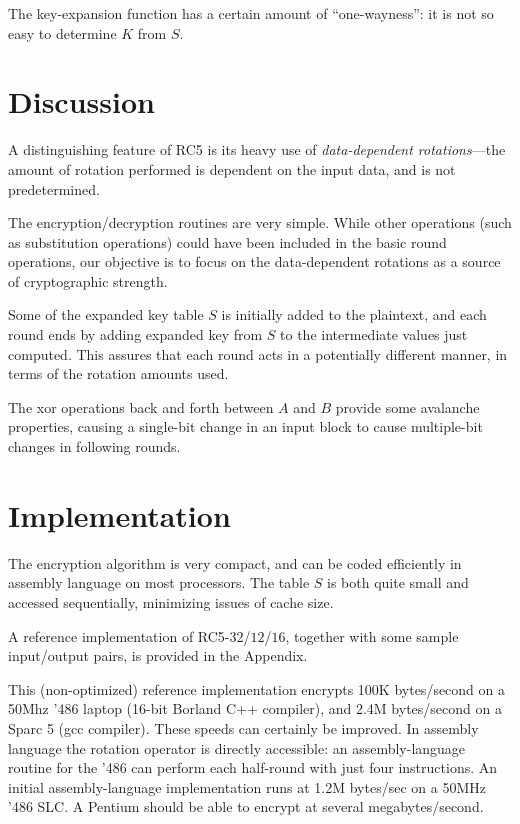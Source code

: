 The key-expansion function has a certain amount of ``one-wayness'': it is
not so easy to determine $K$ from $S$.

\section{Discussion}

A distinguishing feature of RC5 is its heavy use of
{\em data-dependent rotations}---the amount of rotation performed is
dependent on the input data, and is not predetermined.

The encryption/decryption routines are very simple.  While other
operations (such as substitution operations) could have been included
in the basic round operations, our objective is to focus on the
data-dependent rotations as a source of cryptographic strength.

Some of the expanded key table $S$ is initially added to the
plaintext, and each round ends by adding expanded key from $S$
to the intermediate values just computed.  This assures that each round
acts in a potentially different manner, in terms of the rotation amounts
used.

The xor operations back and forth between $A$ and $B$ 
provide some avalanche properties, causing a single-bit
change in an input block to cause multiple-bit changes in following rounds.

\section{Implementation}

The encryption algorithm is very compact, and can be coded efficiently
in assembly language on most processors.  The table $S$ is both quite
small and accessed sequentially, minimizing issues of cache size.

A reference implementation of RC5-$32$/$12$/$16$, together with some
sample input/output pairs, is provided in the Appendix.  

This (non-optimized) reference implementation encrypts 100K
bytes/second on a 50Mhz '486 laptop (16-bit Borland C++ compiler), 
and 2.4M bytes/second on a Sparc 5 (gcc compiler).
These speeds can certainly be improved.  In assembly
language the rotation operator is directly accessible: an
assembly-language routine for the '486 can perform each half-round
with just four instructions. An initial assembly-language
implementation runs at 1.2M bytes/sec on a 50MHz '486 SLC.  A Pentium
should be able to encrypt at several megabytes/second.

